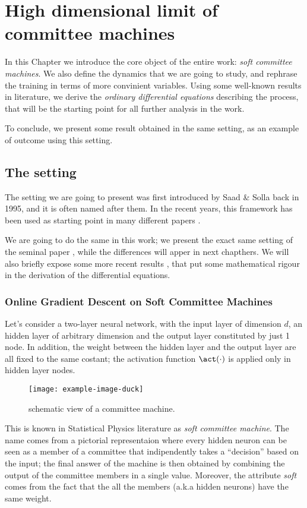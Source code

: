 \chapter{High dimensional limit of committee machines} \label{chap:context}
In this Chapter we introduce the core object of the entire work: \emph{soft committee machines}.
We also define the dynamics that we are going to study, and rephrase the training in terms
of more convinient variables. Using some well-known results in literature, we derive the 
\emph{ordinary differential equations} describing the process, that will be the starting point 
for all further analysis in the work.

To conclude, we present some result obtained in the same setting, as an example of 
outcome using this setting. %

\section{The setting}
The setting we are going to present was first introduced by Saad \& Solla \cite{saad1995line}
back in 1995,
and it is often named after them.
In the recent years, this framework has been used as starting point in many different papers
\cite{aubin2018committee, goldt2019dynamics,veiga2022phase}.

We are going to do the same in this work; we present the exact same setting of the seminal paper \cite{saad1995line}, while the differences
will apper in next chapthers. We will also briefly expose some more recent results \cite{goldt2019dynamics},
that put some mathematical rigour in the derivation of the differential equations.

\subsection{Online Gradient Descent on Soft Committee Machines}
Let's consider a two-layer neural network, with the input layer of dimension \(d\),
an hidden layer of arbitrary dimension and the output layer constituted by just 1 node.
In addition, the weight between the hidden layer and the output layer are all fixed 
to the same costant; the activation function \(\act(\cdot)\) is applied only in hidden layer nodes.
\begin{figure}
  \centering
  \texttt{[image: example-image-duck]}
  \caption{ schematic view of a committee machine.}
\end{figure}
This is known in Statistical Physics literature as \emph{soft
committee machine}. The name comes from a pictorial representaion where every hidden neuron can be seen 
as a member of a committee that indipendently takes a ``decision'' based on the input;
the final answer of the machine is then obtained by combining the output of the committee
members in a single value. Moreover, the attribute \emph{soft} comes from the fact
that the all the members (a.k.a hidden neurons) have the same weight.

